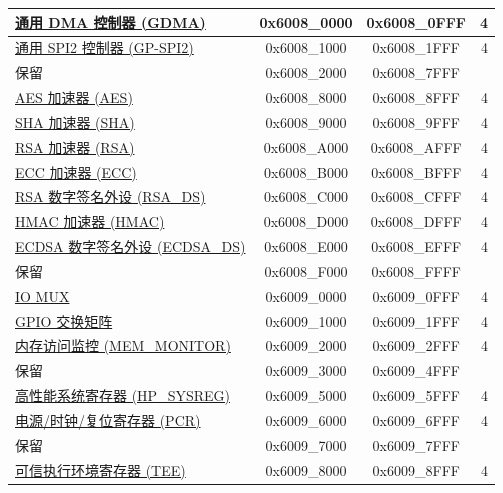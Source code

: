 \begin{ThreePartTable}
\begin{longtable}[c]{ |p{7cm}|c|c|r| }
\hyperref[mod:dma]{通用 DMA 控制器 (GDMA)}& 0x6008\_0000 & 0x6008\_0FFF &   4     \\\hline
\hyperref[mod:spi]{通用 SPI2 控制器 (GP-SPI2)} & 0x6008\_1000 & 0x6008\_1FFF &   4     \\\hline
    \rowcolor{gray!25}  保留                    & 0x6008\_2000 & 0x6008\_7FFF &         \\\hline
\hyperref[mod:aes]{AES 加速器 (AES)} & 0x6008\_8000 & 0x6008\_8FFF &   4     \\\hline
\hyperref[mod:sha]{SHA 加速器 (SHA)} & 0x6008\_9000 & 0x6008\_9FFF &   4     \\\hline
\hyperref[mod:rsa]{RSA 加速器 (RSA)}& 0x6008\_A000 & 0x6008\_AFFF &   4     \\\hline
\hyperref[mod:ecc]{ECC 加速器 (ECC)}& 0x6008\_B000 & 0x6008\_BFFF &   4     \\\hline
\hyperref[mod:digsig]{RSA 数字签名外设 (RSA\_DS)}  & 0x6008\_C000 & 0x6008\_CFFF &   4     \\\hline
\hyperref[mod:hmac]{HMAC 加速器 (HMAC)}& 0x6008\_D000 & 0x6008\_DFFF &   4     \\\hline
\hyperref[mod:ecdsa]{ECDSA 数字签名外设 (ECDSA\_DS)}& 0x6008\_E000 & 0x6008\_EFFF &   4     \\\hline
    \rowcolor{gray!25}  保留                    & 0x6008\_F000 & 0x6008\_FFFF &         \\\hline
\hyperref[mod:iomuxgpio]{IO MUX}                      & 0x6009\_0000 & 0x6009\_0FFF &   4     \\\hline
\hyperref[mod:iomuxgpio]{GPIO 交换矩阵}& 0x6009\_1000 & 0x6009\_1FFF &   4     \\\hline
\hyperref[mod:dbgassist]{内存访问监控 (MEM\_MONITOR)}\tnote{\textcolor{red}{*}}                & 0x6009\_2000 & 0x6009\_2FFF &   4   \\\hline
    \rowcolor{gray!25}  保留                    & 0x6009\_3000 & 0x6009\_4FFF &         \\\hline
\hyperref[mod:sysreg]{高性能系统寄存器 (HP\_SYSREG)}               & 0x6009\_5000 & 0x6009\_5FFF &   4     \\\hline
\hyperref[mod:resclk]{电源/时钟/复位寄存器 (PCR)}                     & 0x6009\_6000 & 0x6009\_6FFF &   4     \\\hline
    \rowcolor{gray!25}  保留                    & 0x6009\_7000 & 0x6009\_7FFF &         \\\hline
\hyperref[mod:permctrl]{可信执行环境寄存器 (TEE)}\tnote{\textcolor{red}{*}}                     & 0x6009\_8000 & 0x6009\_8FFF &   4 \\\hline

\end{longtable}
\end{ThreePartTable}
